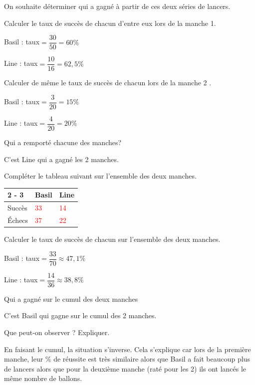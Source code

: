 \documentclass[11pt,a4paper]{article}  %
\begin{document}
On souhaite déterminer qui a gagné à partir de ces deux séries de lancers.
\begin{enumMet}
	\item \begin{enumMet}
		\item Calculer le taux de succès de chacun d'entre eux lors de la manche 1. \quad {}
		\begin{corrBox}
			Basil : taux$=\dfrac{30}{50}=60\%$
			
			Line : taux$=\dfrac{10}{16}=62,5\%$
		\end{corrBox}
		\item Calculer de même le taux de succès de chacun lors de la manche 2 . \quad {}
		\begin{corrBox}
			Basil : taux$=\dfrac{3}{20}=15\%$
			
			Line : taux$=\dfrac{4}{20}=20\%$
		\end{corrBox}
		\item Qui a remporté chacune des manches? \quad {}
		\begin{corrBox}
			C'est Line qui a gagné les 2 manches.	
		\end{corrBox}
	\end{enumMet}
	\item \begin{enumMet}
		\item {} Compléter le tableau suivant sur l'ensemble des deux manches. \quad \bareme{2}
		
		\begin{tabular}{|l|l|l|}
			\cline { 2 - 3 } \multicolumn{1}{c|}{} & Basil & Line \\
			\hline Succès & \textcolor{red}{33} & \textcolor{red}{14}\\
			\hline Échecs & \textcolor{red}{37} & \textcolor{red}{22}\\
			\hline
		\end{tabular}
		\item {} Calculer le taux de succès de chacun sur l'ensemble des deux manches. \quad \bareme{1}
		\begin{corrBox}
			Basil : taux$=\dfrac{33}{70}\approx47,1\%$
			
			Line : taux$=\dfrac{14}{36}\approx 38,8\%$
		\end{corrBox}
		\item {} Qui a gagné sur le cumul des deux manches \quad \bareme{1}
		\begin{corrBox}
			C'est Basil qui gagne sur le cumul des 2 manches.	
		\end{corrBox}
	\end{enumMet}
	\item {} Que peut-on observer ? Expliquer. \quad {}
	\begin{corrBox}
		En faisant le cumul, la situation s'inverse. Cela s'explique car lors de la première manche, leur \% de réussite est très similaire alors que Basil a fait beaucoup plus de lancers alors que pour la deuxième manche (raté pour les 2) ils ont lancés le même nombre de ballons. 
	\end{corrBox}
\end{enumMet}
\end{document}
